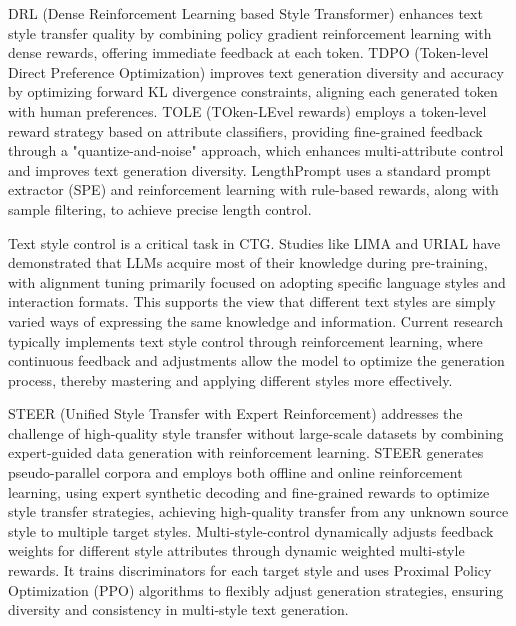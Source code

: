 \documentclass[acmsmall, screen]{acmart}
\begin{document}
DRL (Dense Reinforcement Learning based Style Transformer) \cite{upadhyay_arxiv22_DRL} enhances text style transfer quality by combining policy gradient reinforcement learning with dense rewards, offering immediate feedback at each token. TDPO (Token-level Direct Preference Optimization) \cite{zeng_arxiv24_TDPO} improves text generation diversity and accuracy by optimizing forward KL divergence constraints, aligning each generated token with human preferences. TOLE (TOken-LEvel rewards) \cite{li_arxiv24_TOLE} employs a token-level reward strategy based on attribute classifiers, providing fine-grained feedback through a "quantize-and-noise" approach, which enhances multi-attribute control and improves text generation diversity. LengthPrompt \cite{jie_acl24_LengthPrompt} uses a standard prompt extractor (SPE) and reinforcement learning with rule-based rewards, along with sample filtering, to achieve precise length control.

Text style control is a critical task in CTG. Studies like LIMA \cite{zhou_neurips23_LIMA} and URIAL \cite{lin_iclr24_URIAL} have demonstrated that LLMs acquire most of their knowledge during pre-training, with alignment tuning primarily focused on adopting specific language styles and interaction formats. This supports the view that different text styles are simply varied ways of expressing the same knowledge and information. Current research typically implements text style control through reinforcement learning, where continuous feedback and adjustments allow the model to optimize the generation process, thereby mastering and applying different styles more effectively.

STEER (Unified Style Transfer with Expert Reinforcement) \cite{hallinan_emnlp23_STEER} addresses the challenge of high-quality style transfer without large-scale datasets by combining expert-guided data generation with reinforcement learning. STEER generates pseudo-parallel corpora and employs both offline and online reinforcement learning, using expert synthetic decoding and fine-grained rewards to optimize style transfer strategies, achieving high-quality transfer from any unknown source style to multiple target styles. Multi-style-control \cite{delangis_arxiv24_MSC} dynamically adjusts feedback weights for different style attributes through dynamic weighted multi-style rewards. It trains discriminators for each target style and uses Proximal Policy Optimization (PPO) algorithms to flexibly adjust generation strategies, ensuring diversity and consistency in multi-style text generation.
\end{document}
